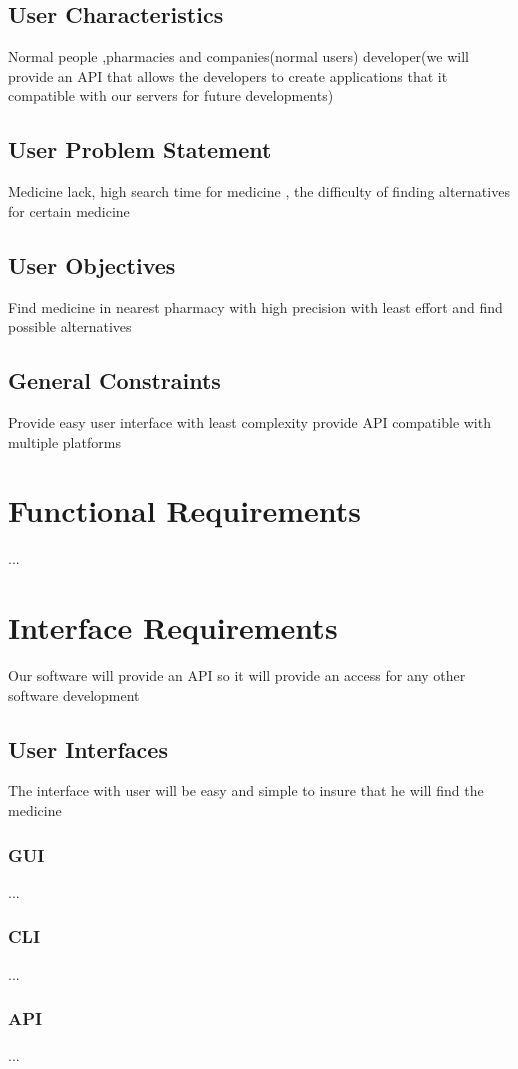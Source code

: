 \documentclass[]{article}
\begin{document}
\subsection{ User Characteristics}
Normal people ,pharmacies and companies(normal users) developer(we will provide an API that allows the developers to create applications that it compatible with our servers for future developments)
\subsection{ User Problem Statement}
Medicine lack, high search time for medicine , the difficulty of finding alternatives for certain medicine
\subsection{ User Objectives}
Find medicine in nearest pharmacy with high precision with least effort and find possible alternatives 
\subsection{ General Constraints}
Provide easy user interface with least complexity 
provide API compatible with multiple platforms


\section{Functional Requirements}
... 



\section{Interface Requirements}
Our software will provide an API so it will provide an access for any other software development
\subsection{User Interfaces}
The interface with user will be easy and simple to insure  that he will find the medicine
\subsubsection {GUI}
...
\subsubsection {CLI}
...
\subsubsection {API}
... 
\end{document}

